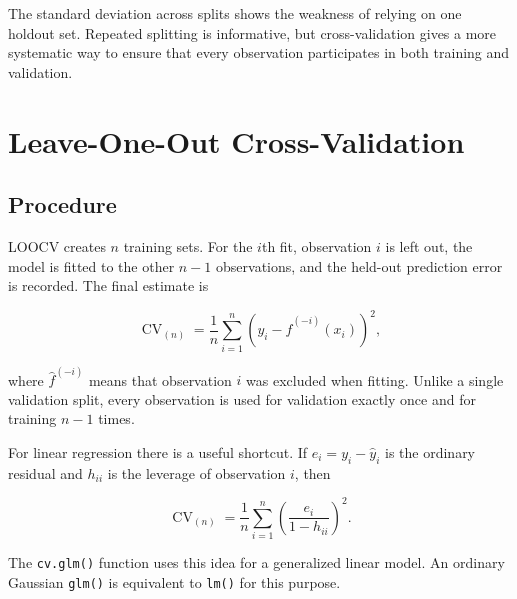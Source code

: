 \documentclass[
  11pt,
]{article}
\begin{document}
The standard deviation across splits shows the weakness of relying on
one holdout set. Repeated splitting is informative, but cross-validation
gives a more systematic way to ensure that every observation
participates in both training and validation.

\section{Leave-One-Out
Cross-Validation}\label{leave-one-out-cross-validation}

\subsection{Procedure}\label{procedure}

LOOCV creates \(n\) training sets. For the \(i\)th fit, observation
\(i\) is left out, the model is fitted to the other \(n-1\)
observations, and the held-out prediction error is recorded. The final
estimate is

\[
\operatorname{CV}_{(n)}
= \frac{1}{n}\sum_{i=1}^{n}
\left(y_i - \hat{f}^{(-i)}(x_i)\right)^2,
\]

where \(\hat{f}^{(-i)}\) means that observation \(i\) was excluded when
fitting. Unlike a single validation split, every observation is used for
validation exactly once and for training \(n-1\) times.

For linear regression there is a useful shortcut. If
\(e_i=y_i-\hat{y}_i\) is the ordinary residual and \(h_{ii}\) is the
leverage of observation \(i\), then

\[
\operatorname{CV}_{(n)}
= \frac{1}{n}\sum_{i=1}^{n}
\left(\frac{e_i}{1-h_{ii}}\right)^2.
\]

The \texttt{cv.glm()} function uses this idea for a generalized linear
model. An ordinary Gaussian \texttt{glm()} is equivalent to
\texttt{lm()} for this purpose.
\end{document}
